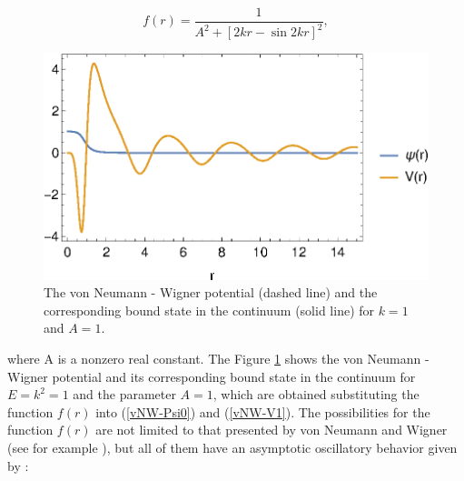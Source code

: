 \documentclass[a4paper]{jpconf}
\begin{document}
\begin{equation}
f(r)=\frac{1}{A^2+[2kr-\sin{2kr}]^2},\label{vNW-f}
\end{equation}


\begin{figure}
\begin{center}
\includegraphics[scale=0.7]{vNW-Figure.eps}
\end{center}
\caption{\label{vNW-Figure} The von Neumann - Wigner potential (dashed line) and the corresponding bound state in the continuum (solid line) for $k=1$ and $A=1$.}
\end{figure}
where A is a nonzero real constant. The Figure \ref{vNW-Figure} shows the von Neumann - Wigner potential and its corresponding bound state in the continuum for $E=k^2=1$ and the parameter $A=1$, which are obtained substituting the function $f(r)$ into (\ref{vNW-Psi0}) and (\ref{vNW-V1}). The possibilities for the function $f(r)$ are not limited to that presented by von Neumann and Wigner (see for example \cite{Stillinger}), but all of them have an asymptotic oscillatory behavior given by \cite{Stahlhofen}:
\end{document}
